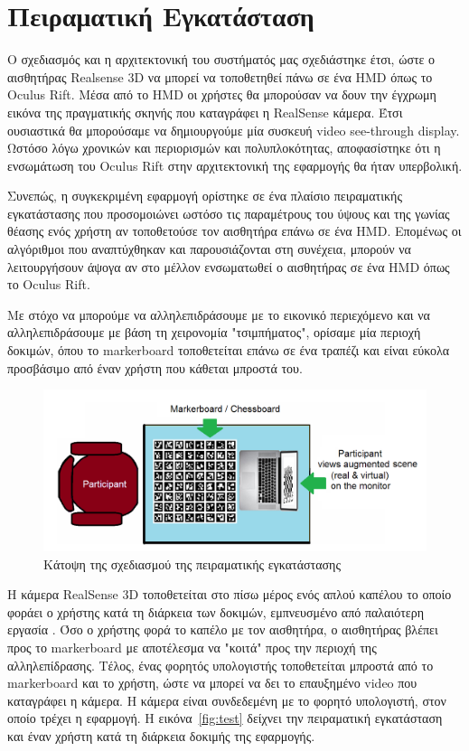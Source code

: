 \section{Πειραματική Εγκατάσταση}

Ο σχεδιασμός και η αρχιτεκτονική του συστήματός μας σχεδιάστηκε έτσι, ώστε ο αισθητήρας Realsense 3D να μπορεί να τοποθετηθεί πάνω σε ένα HMD όπως το Oculus Rift. Μέσα από το HMD οι χρήστες θα μπορούσαν να δουν την έγχρωμη εικόνα της πραγματικής σκηνής που καταγράφει η RealSense\texttrademark{} κάμερα. Έτσι ουσιαστικά θα μπορούσαμε να δημιουργούμε μία συσκευή video see-through display. Ωστόσο λόγω χρονικών και περιορισμών και πολυπλοκότητας, αποφασίστηκε ότι η ενσωμάτωση του Oculus Rift στην αρχιτεκτονική της εφαρμογής θα ήταν υπερβολική. 


Συνεπώς, η συγκεκριμένη εφαρμογή ορίστηκε σε ένα πλαίσιο πειραματικής εγκατάστασης που προσομοιώνει ωστόσο τις παραμέτρους του ύψους και της γωνίας θέασης ενός χρήστη αν τοποθετούσε τον αισθητήρα επάνω σε ένα HMD. Επομένως οι αλγόριθμοι που αναπτύχθηκαν και παρουσιάζονται στη συνέχεια, μπορούν να λειτουργήσουν άψογα αν στο μέλλον ενσωματωθεί ο αισθητήρας σε ένα HMD όπως το Oculus Rift. 


Με στόχο να μπορούμε να αλληλεπιδράσουμε με το εικονικό περιεχόμενο και να αλληλεπιδράσουμε με βάση τη χειρονομία "τσιμπήματος", ορίσαμε μία περιοχή δοκιμών, όπου το markerboard τοποθετείται επάνω σε ένα τραπέζι και είναι εύκολα προσβάσιμο από έναν χρήστη που κάθεται μπροστά του. 


\begin{figure}[H]
    \centering
    \includegraphics[scale=0.8, angle=0]{Files/Figures/planviewoftheexperimentalsetup.png}
    \caption[Κάτοψη της σχεδιασμού της πειραματικής εγκατάστασης]{Κάτοψη της σχεδιασμού της πειραματικής εγκατάστασης}
    \label{fig:ps3game}
\end{figure}


Η κάμερα RealSense\texttrademark{} 3D τοποθετείται στο πίσω μέρος ενός απλού καπέλου το οποίο φοράει ο χρήστης κατά τη διάρκεια των δοκιμών, εμπνευσμένο από παλαιότερη εργασία \cite{Mathews2007}. Όσο ο χρήστης φορά το καπέλο με τον αισθητήρα, ο αισθητήρας βλέπει προς το markerboard με αποτέλεσμα να "κοιτά" προς την περιοχή της αλληλεπίδρασης. Τέλος, ένας φορητός υπολογιστής τοποθετείται μπροστά από το markerboard και το χρήστη, ώστε να μπορεί να δει το επαυξημένο video που καταγράφει η κάμερα. Η κάμερα είναι συνδεδεμένη με το φορητό υπολογιστή, στον οποίο τρέχει η εφαρμογή. Η εικόνα~\ref{fig:test} δείχνει την πειραματική εγκατάσταση και έναν χρήστη κατά τη διάρκεια δοκιμής της εφαρμογής.



